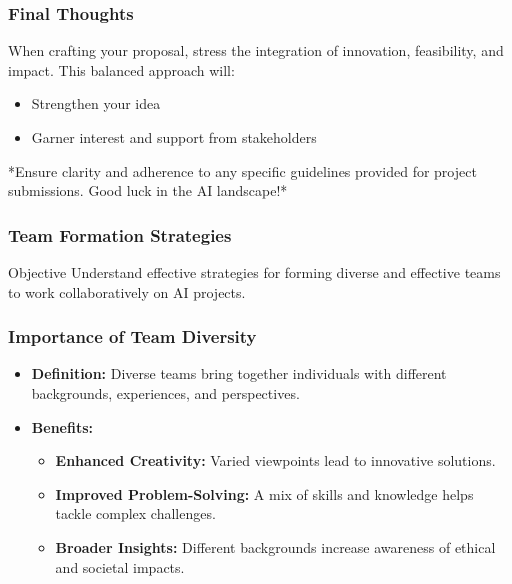 \documentclass[aspectratio=169]{beamer}
\begin{document}
\begin{frame}[fragile]
    \frametitle{Final Thoughts}
    When crafting your proposal, stress the integration of innovation, feasibility, and impact. This balanced approach will:
    \begin{itemize}
        \item Strengthen your idea
        \item Garner interest and support from stakeholders
    \end{itemize}
    *Ensure clarity and adherence to any specific guidelines provided for project submissions. Good luck in the AI landscape!*
\end{frame}

\begin{frame}[fragile]
    \frametitle{Team Formation Strategies}
    \begin{block}{Objective}
        Understand effective strategies for forming diverse and effective teams to work collaboratively on AI projects.
    \end{block}
\end{frame}

\begin{frame}[fragile]
    \frametitle{Importance of Team Diversity}

    \begin{itemize}
        \item \textbf{Definition:} Diverse teams bring together individuals with different backgrounds, experiences, and perspectives.
        \item \textbf{Benefits:}
        \begin{itemize}
            \item \textbf{Enhanced Creativity:} Varied viewpoints lead to innovative solutions.
            \item \textbf{Improved Problem-Solving:} A mix of skills and knowledge helps tackle complex challenges.
            \item \textbf{Broader Insights:} Different backgrounds increase awareness of ethical and societal impacts.
        \end{itemize}
    \end{itemize}
\end{frame}
\end{document}

